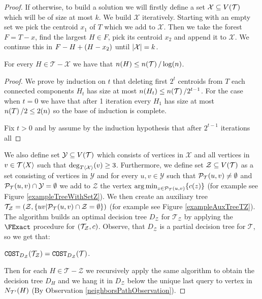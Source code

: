 \begin{theorem}
\begin{proof}
If otherwise, to build a solution we will firstly define a set $\mathcal{X}\subseteq V\mathopen{}\left( \mathcal{T} \right)$ which will be of size at most $k$. We build $\mathcal{X}$ iteratively. Starting with an empty set we pick the centroid $x_1$ of $T$ which we add to $\mathcal{X}$. Then we take the forest $F=T-x$, find the largest $H\in F$, pick its centroid $x_2$ and append it to $\mathcal{X}$. We continue this in $F-H + \mathopen{}\left( H-x_2 \right)$ until $\mathopen{}\left| \mathcal{X} \right|=k$.
\begin{lemma}\label{lemma:componentSize}
    For every $H\in \mathcal{T}-\mathcal{X}$ we have that $n\mathopen{}\left( H \right)\leq n\mathopen{}\left( \mathcal{T} \right)/\log\mathopen{}\left( n \right)$.
    \begin{proof}
        We prove by induction on $t$ that deleting first $2^t$ centroids from $T$ each connected components $H_t$ has size at most $n\mathopen{}\left( H_t \right)\leq n\mathopen{}\left( \mathcal{T} \right)/2^{t-1}$. For the case when $t=0$ we have that after 1 iteration every $H_1$ has size at most $n\mathopen{}\left( T \right)/2\leq 2\mathopen{}\left( n \right)$ so the base of induction is complete.

        Fix $t>0$ and by assume by the induction hypothesis that after $2^{t-1}$ iterations all
    \end{proof}
\end{lemma}

We also define set $\mathcal{Y}\subseteq V\mathopen{}\left( \mathcal{T} \right)$ which consists of vertices in $\mathcal{X}$ and all vertices in $v\in \mathcal{T}\mathopen{}\langle X \rangle$ such that $\deg_{T\mathopen{}\langle \mathcal{X} \rangle}\mathopen{}\left( v \right)\geq 3$.
Furthermore, we define set $\mathcal{Z}\subseteq V\mathopen{}\left( \mathcal{T} \right)$ as a set consisting of vertices in $\mathcal{Y}$ and for every $u,v\in \mathcal{Y}$ such that $\mathcal{P}_{\mathcal{T}}\mathopen{}\left( u, v \right)\neq\emptyset$ and $\mathcal{P}_{\mathcal{T}}\mathopen{}\left( u, v \right)\cap \mathcal{Y}=\emptyset$ we add to $\mathcal{Z}$ the vertex $\operatorname*{arg\,min}_{z\in \mathcal{P}_{\mathcal{T}}\mathopen{}\left( u, v \right)}\mathopen{}\left\{ c\mathopen{}\left( z \right) \right\}$ (for example see Figure \ref{exampleTreeWithSetZ}). We then create an auxiliary tree $\mathcal{T}_{\mathcal{Z}}=\mathopen{}\left( \mathcal{Z},\mathopen{}\left\{ uv|\mathcal{P}_{\mathcal{T}}\mathopen{}\left( u, v \right)\cap \mathcal{Z}=\emptyset \right\} \right)$ (for example see Figure \ref{exampleAuxTreeTZ}). The algorithm builds an optimal decision tree $D_{\mathcal{Z}}$ for $\mathcal{T}_{\mathcal{Z}}$ by applying the $\FExact$ procedure for $\mathopen{}\left( \mathcal{T}_{\mathcal{Z}},c \right)$. Observe, that $D_{\mathcal{Z}}$ is a  partial decision tree for $\mathcal{T}$, so we get that:
\begin{observation}\label{observation:CostDZinT}
    $\texttt{COST}_{D_{\mathcal{Z}}}\mathopen{}\left( \mathcal{T}_{\mathcal{Z}} \right)=\texttt{COST}_{D_{\mathcal{Z}}}\mathopen{}\left( \mathcal{T} \right)$.
\end{observation}
Then for each $H\in \mathcal{T}-\mathcal{Z}$ we recursively apply the same algorithm to obtain the decision tree $D_H$ and we hang it in $D_\mathcal{Z}$ below the unique last query to vertex in $N_{\mathcal{T}'}\mathopen{}\left( H \right)$ (By Observation \ref{neighborsPathObservation}).




\end{proof}
\end{theorem}
